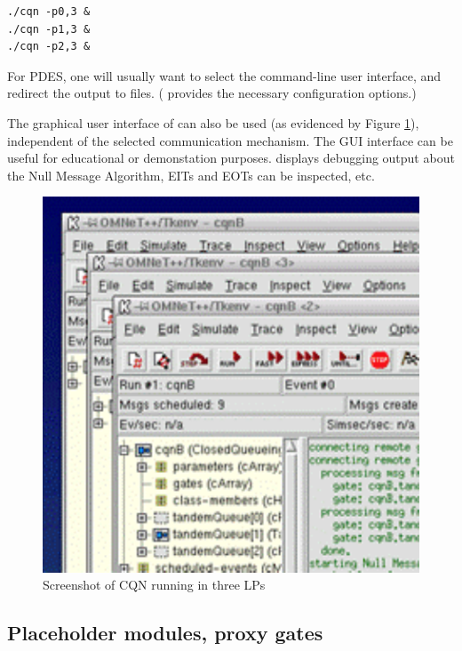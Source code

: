 \begin{verbatim}
./cqn -p0,3 &
./cqn -p1,3 &
./cqn -p2,3 &
\end{verbatim}

For PDES, one will usually want to select the command-line user interface,
and redirect the output to files. ({\opp} provides the necessary
configuration options.)

The graphical user interface of {\opp} can also be used
(as evidenced by Figure \ref{fig:parsim-screenshot}),
independent of the selected communication mechanism.
The GUI interface can be useful for educational or demonstation purposes.
{\opp} displays debugging output about the Null Message Algorithm,
EITs and EOTs can be inspected, etc.




\begin{figure}[htbp]
  \begin{center}
    \includegraphics{figures/parsim-screenshot}
    \caption{Screenshot of CQN running in three LPs}
    \label{fig:parsim-screenshot}
  \end{center}
\end{figure}



\subsection{Placeholder modules, proxy gates}

